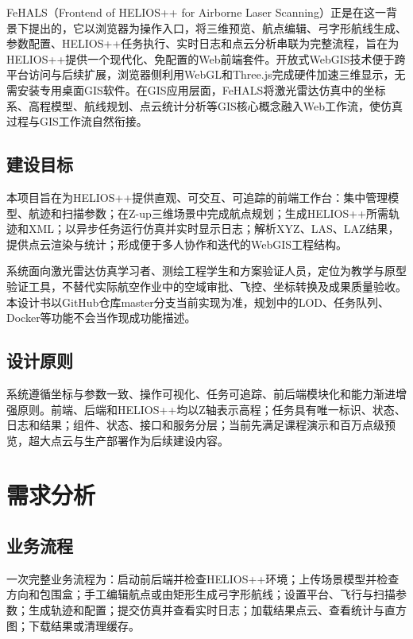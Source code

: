 \documentclass[a4paper,fleqn]{cas-sc}
\begin{document}
FeHALS（Frontend of HELIOS++ for Airborne Laser Scanning）正是在这一背景下提出的，它以浏览器为操作入口，将三维预览、航点编辑、弓字形航线生成、参数配置、HELIOS++任务执行、实时日志和点云分析串联为完整流程，旨在为HELIOS++提供一个现代化、免配置的Web前端套件。开放式WebGIS技术便于跨平台访问与后续扩展\citep{opengis,viswebdrone,lidarWebgis}，浏览器侧利用WebGL和Three.js完成硬件加速三维显示，无需安装专用桌面GIS软件。在GIS应用层面，FeHALS将激光雷达仿真中的坐标系、高程模型、航线规划、点云统计分析等GIS核心概念融入Web工作流，使仿真过程与GIS工作流自然衔接\citep{pointCloudWeb}。

\subsection{建设目标}

本项目旨在为HELIOS++提供直观、可交互、可追踪的前端工作台：集中管理模型、航迹和扫描参数；在Z-up三维场景中完成航点规划；生成HELIOS++所需轨迹和XML；以异步任务运行仿真并实时显示日志；解析XYZ、LAS、LAZ结果，提供点云渲染与统计；形成便于多人协作和迭代的WebGIS工程结构。

系统面向激光雷达仿真学习者、测绘工程学生和方案验证人员，定位为教学与原型验证工具，不替代实际航空作业中的空域审批、飞控、坐标转换及成果质量验收。本设计书以GitHub仓库master分支当前实现为准，规划中的LOD、任务队列、Docker等功能不会当作现成功能描述。

\subsection{设计原则}

系统遵循坐标与参数一致、操作可视化、任务可追踪、前后端模块化和能力渐进增强原则。前端、后端和HELIOS++均以Z轴表示高程；任务具有唯一标识、状态、日志和结果；组件、状态、接口和服务分层；当前先满足课程演示和百万点级预览，超大点云与生产部署作为后续建设内容。

\section{需求分析}

\subsection{业务流程}

一次完整业务流程为：启动前后端并检查HELIOS++环境；上传场景模型并检查方向和包围盒；手工编辑航点或由矩形生成弓字形航线；设置平台、飞行与扫描参数；生成轨迹和配置；提交仿真并查看实时日志；加载结果点云、查看统计与直方图；下载结果或清理缓存。
\end{document}
